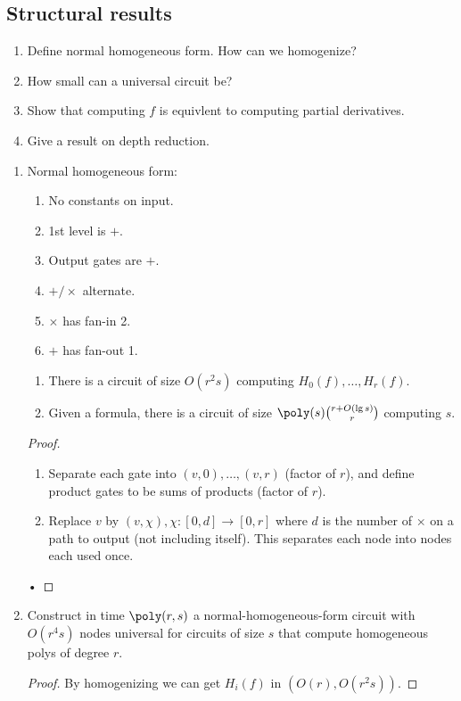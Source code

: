 \subsection{Structural results}
\begin{enumerate}
\item Define normal homogeneous form. How can we homogenize?
\item How small can a universal circuit be? 
\item Show that computing $f$ is equivlent to computing partial derivatives.
\item
Give a result on depth reduction.
\end{enumerate}
\begin{enumerate}
\item
Normal homogeneous form:
\begin{enumerate}
\item
No constants on input.
\item
1st level is $+$.
\item Output gates are $+$.
\item $+/\times$ alternate.
\item $\times$ has fan-in 2.
\item $+$ has fan-out 1.
\end{enumerate}
\begin{lem}[Homogenization]
\begin{enumerate}
\item
There is a circuit of size $O(r^2s)$ computing $H_0(f),\ldots, H_r(f)$. 
\item
Given a formula, there is a circuit of size $\poly(s)\binom{r+O(\lg s)}{r}$ computing $s$.
\end{enumerate}
\end{lem}
\begin{proof}
\begin{enumerate}
\item
Separate each gate into $(v,0),\ldots, (v,r)$ (factor of $r$), and define product gates to be sums of products (factor of $r$).
\item {} Replace $v$ by $(v,\chi), \chi:[0,d]\to [0,r]$  where $d$ is the number of $\times$ on a path to output (not including itself). %
This separates each node into nodes each used once.
\end{enumerate}•
\end{proof}
\item
\begin{thm}
Construct in time $\poly(r,s)$ a normal-homogeneous-form circuit with $O(r^4s)$ nodes universal for circuits of size $s$ that compute homogeneous polys of degree $r$.
\end{thm}
\begin{proof}
By homogenizing we can get $H_i(f)$ in $(O(r),O(r^2s))$.
 

\end{proof}
\end{enumerate}
